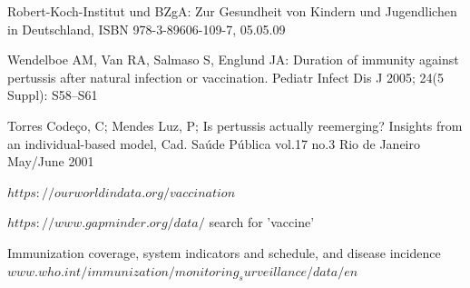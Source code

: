 \documentclass[11pt]{article}
\begin{document}
Robert-Koch-Institut und BZgA: Zur Gesundheit von Kindern und Jugendlichen in Deutschland, ISBN 978-3-89606-109-7, 05.05.09

Wendelboe AM, Van RA, Salmaso S, Englund JA: Duration of immunity against pertussis after natural infection or vaccination. Pediatr Infect Dis J 2005; 24(5 Suppl): S58–S61
\vspace{14px}

Torres Codeço, C; Mendes Luz, P; Is pertussis actually reemerging? Insights from an individual-based model, Cad. Saúde Pública vol.17 no.3 Rio de Janeiro May/June 2001
\vspace{14px}

$https://ourworldindata.org/vaccination$ 
\vspace{14px}

$https://www.gapminder.org/data/$ search for 'vaccine'
\vspace{14px}

Immunization coverage, system indicators and schedule, and disease incidence $www.who.int/immunization/monitoring_surveillance/data/en$


\newpage
\end{document}
